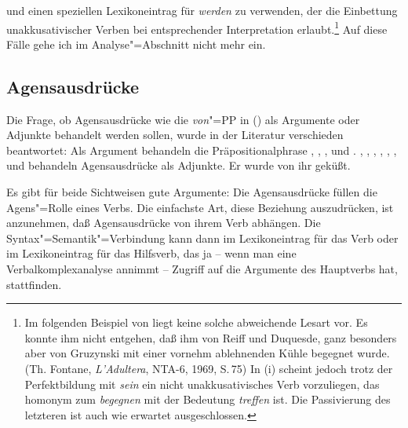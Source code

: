 und einen speziellen Lexikoneintrag für \emph{werden} zu verwenden, der die Einbettung
unakkusativischer Verben bei entsprechender Interpretation erlaubt.\footnote{
        Im folgenden Beispiel von \citet[]{Faucher87}
        liegt keine solche abweichende Lesart vor.
        \ea
        Es konnte ihm nicht entgehen, daß ihm von Reiff und Duquesde,
        ganz besonders aber von Gruzynski mit einer vornehm
        ablehnenden Kühle begegnet wurde. (Th. Fontane, {\em L'Adultera},
        NTA-6, 1969, S.\,75)
        \z
        In (i) scheint jedoch trotz der Perfektbildung mit \emph{sein}
        ein nicht unakkusativisches Verb vorzuliegen, das homonym zum \emph{begegnen}
        mit der Bedeutung \emph{treffen} ist. Die Passivierung des letzteren
        ist auch wie erwartet ausgeschlossen.
        \eal
        \zllast
}
Auf  diese Fälle gehe ich im Analyse"=Abschnitt nicht mehr ein.


\subsection{Agensausdrücke}

Die Frage, ob Agensausdrücke wie die \emph{von}"=PP in () als Argumente oder Adjunkte behandelt werden sollen,
wurde in der Literatur verschieden beantwortet: Als Argument behandeln 
die Präpositionalphrase \zb 
\citet[]{Heringer73a}, 
\citet{Bresnan82a},
\citet{ps}, 
\citet{MS98a} und
\citet[Kapitel~15.3]{Mueller99a}.
%
\citet[]{Hoehle78a}, \citet{Sadzinski87a}, \citet[]{Stechow90a}, 
\citet[]{Zifonun92a}, 
\citet[]{Lieb92a},
\citet[]{Wunderlich93a}, 
\citet{Mueller2003e} und 
\citet[]{Gunkel2003b} 
behandeln Agensausdrücke als Adjunkte.
\ea
Er wurde von ihr geküßt.
\z

\noindent
Es gibt für beide Sichtweisen gute Argumente: Die Agensausdrücke füllen die Agens"=Rolle
eines Verbs. Die einfachste Art, diese Beziehung auszudrücken, ist anzunehmen, daß Agensausdrücke
von ihrem Verb abhängen. Die Syntax"=Semantik"=Verbindung kann dann im Lexikoneintrag für das
Verb oder im Lexikoneintrag für das Hilfsverb, das ja -- wenn man eine Verbalkomplexanalyse annimmt --
Zugriff auf die Argumente des Hauptverbs hat, stattfinden.

